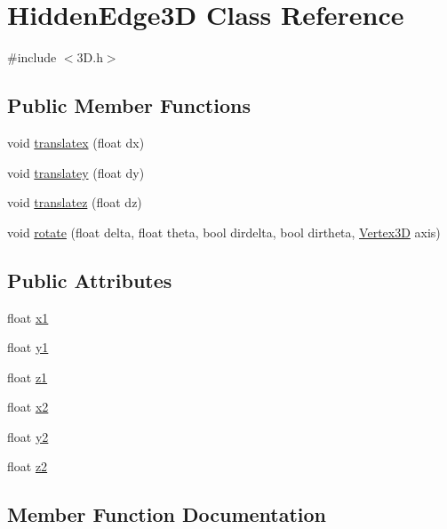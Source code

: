 \hypertarget{class_hidden_edge3_d}{}\section{Hidden\+Edge3D Class Reference}
\label{class_hidden_edge3_d}


{\ttfamily \#include $<$3\+D.\+h$>$}

\subsection*{Public Member Functions}
\begin{DoxyCompactItemize}
\item 
void \hyperlink{class_hidden_edge3_d_aedf332a2aa957efd4be521ffe5de868c}{translatex} (float dx)
\item 
void \hyperlink{class_hidden_edge3_d_a2912400550dc2ce265d763bfc3ee37f3}{translatey} (float dy)
\item 
void \hyperlink{class_hidden_edge3_d_a0ad57fedf20a63330d4400428cc89944}{translatez} (float dz)
\item 
void \hyperlink{class_hidden_edge3_d_a9496ea047e094f6fbd7b771f23ef0421}{rotate} (float delta, float theta, bool dirdelta, bool dirtheta, \hyperlink{class_vertex3_d}{Vertex3D} axis)
\end{DoxyCompactItemize}
\subsection*{Public Attributes}
\begin{DoxyCompactItemize}
\item 
float \hyperlink{class_hidden_edge3_d_ac94f3b0de2ce7ab0116e7b16afb73c9f}{x1}
\item 
float \hyperlink{class_hidden_edge3_d_afc1062ae59a598ac49d4714c04dee481}{y1}
\item 
float \hyperlink{class_hidden_edge3_d_ae69d570fdf699cb4ea7cd042610bdf44}{z1}
\item 
float \hyperlink{class_hidden_edge3_d_a29504683269645a6afd888ff8b6ba61b}{x2}
\item 
float \hyperlink{class_hidden_edge3_d_aa0ac42b2b1cc52adea284863f2530c50}{y2}
\item 
float \hyperlink{class_hidden_edge3_d_a0434915b2dd8ae71eccf8ecdba418da5}{z2}
\end{DoxyCompactItemize}


\subsection{Member Function Documentation}
